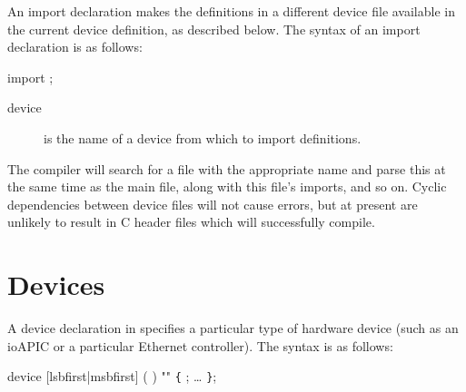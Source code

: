 \documentclass[a4paper,11pt,twoside]{report}
\begin{document}
An import declaration makes the definitions in a different device file
available in the current device definition, as described below.  The
syntax of an import declaration is as follows:

\begin{syntax}
import ;
\end{syntax}

\begin{description}
\item[device] is the name of a device from which to import
  definitions.  
\end{description}

The \Mac compiler will search for a file with the appropriate name and
parse this at the same time as the main file, along with this file's
imports, and so on.  Cyclic dependencies between device files will not
cause errors, but at present are unlikely to result in C header files
which will successfully compile. 

\section{Devices}\label{sec:devices}

A device declaration in \Mac specifies a particular type of hardware
device (such as an ioAPIC or a particular Ethernet controller).   The
syntax is as follows:

\begin{syntax}
device  [lsbfirst|msbfirst] (  ) ""
\verb+{+
  ;
  \ldots
\verb+}+;
\end{syntax}
\end{document}
